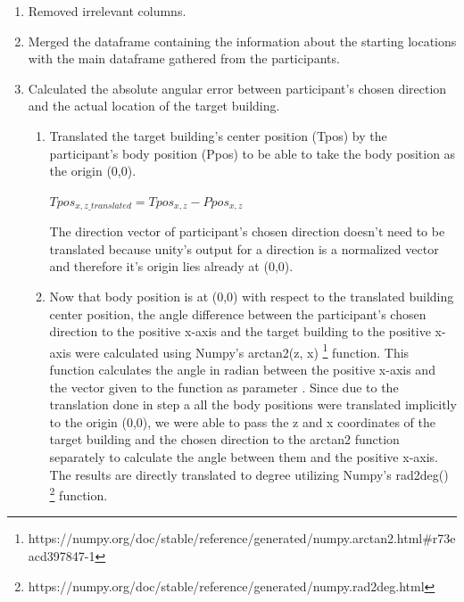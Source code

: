 \begin{enumerate}
	\item Removed irrelevant columns.
	\item Merged the dataframe containing the information about the starting locations with the main dataframe gathered from the participants.
	\item Calculated the absolute angular error between participant's chosen direction and the actual location of the target building.
	
	\begin{enumerate}
		\item Translated the target building's center position (Tpos) by the participant's body position (Ppos) to be able to take the body position as the origin (0,0).
			\begin{center}
				$Tpos_{x,z\_translated}= Tpos_{x,z} - Ppos_{x,z}$
			\end{center}
		The direction vector of participant's chosen direction doesn't need to be translated because unity's output for a direction is a normalized vector and therefore it's origin lies already at (0,0).\\
		
		\item Now that body position is at (0,0) with respect to the translated building center position, the angle difference between the participant's chosen direction to the positive x-axis and the target building to the positive x-axis were calculated using Numpy's arctan2(z, x)  \footnote{https://numpy.org/doc/stable/reference/generated/numpy.arctan2.html\#r73eacd397847-1} function. This function calculates the angle in radian between the positive x-axis and the vector given to the function as parameter . Since due to the translation done in step a all the body positions were translated implicitly to the origin (0,0), we were able to pass the z and x coordinates of the target building and the chosen direction to the arctan2 function separately to calculate the angle between them and the positive x-axis. The results are directly translated to degree utilizing Numpy's rad2deg()  \footnote{https://numpy.org/doc/stable/reference/generated/numpy.rad2deg.html} function.
		
	\end{enumerate}
\end{enumerate}


